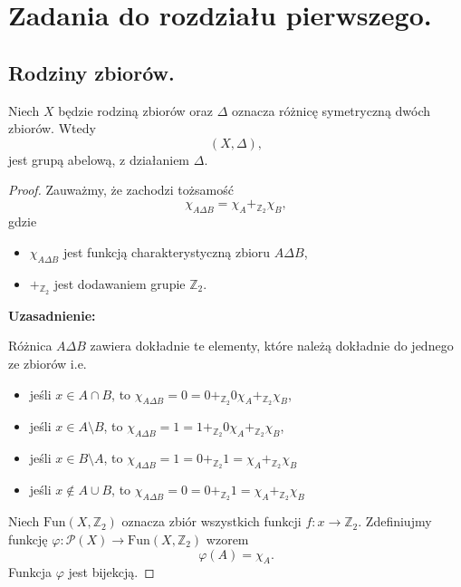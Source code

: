 \chapter{Zadania do rozdziału pierwszego.}

\section{Rodziny zbiorów.}

\begin{lemma}
Niech $X$ będzie rodziną zbiorów oraz $\Delta $ oznacza różnicę symetryczną dwóch zbiorów. Wtedy
\[
	\left( X , \Delta  \right) 
,\] 
jest grupą abelową, z działaniem $\Delta $.
\end{lemma} 
\begin{proof}
	\noindent Zauważmy, że zachodzi tożsamość
	\[
	\chi_{A \Delta B} = \chi_{A} +_{\scriptscriptstyle \mathbb{Z}_2} \chi_{B}
	,\] 
	gdzie
	\begin{itemize}
		\item $\chi_{A \Delta B}$ jest funkcją charakterystyczną zbioru $A \Delta B$,
		\item $+_{\scriptscriptstyle \mathbb{Z} _{2}}$ jest dodawaniem grupie $\mathbb{Z}_{2}$.
	\end{itemize}
	\noindent \textbf{Uzasadnienie:}

	Różnica $A \Delta B$ zawiera dokładnie te elementy, które należą dokładnie do jednego ze zbiorów i.e. 
	\begin{itemize}
		\item jeśli $x\in A \cap B$, to $\chi_{A \Delta B} = 0 = 0 +_{\scriptscriptstyle \mathbb{Z} _{2}} 0 \chi_{A} +_{\scriptscriptstyle \mathbb{Z} _{2}} \chi_{B}$,
		\item jeśli $x\in A \setminus  B$, to $\chi_{A \Delta B} = 1 = 1 +_{\scriptscriptstyle \mathbb{Z} _{2}} 0 \chi_{A} +_{\scriptscriptstyle \mathbb{Z} _{2}} \chi_{B}$,
		\item jeśli $x\in B \setminus  A$, to $\chi_{A \Delta B} = 1 = 0 +_{\scriptscriptstyle \mathbb{Z} _{2}} 1 =  \chi_{A} +_{\scriptscriptstyle \mathbb{Z} _{2}} \chi_{B}$
		\item jeśli $x\not\in A\cup B$, to $\chi_{A \Delta B} = 0 = 0 +_{\scriptscriptstyle \mathbb{Z} _{2}} 1 =  \chi_{A} +_{\scriptscriptstyle \mathbb{Z} _{2}} \chi_{B}$
	\end{itemize}

	\noindent Niech $\text{Fun}\left( X, \mathbb{Z} _{2} \right) $ oznacza zbiór wszystkich funkcji $f: x \to \mathbb{Z} _{2}$. Zdefiniujmy funkcję $\varphi : \mathcal{P}(X) \to \text{Fun}(X, \mathbb{Z} _{2}) $ wzorem \[
	\varphi \left( A \right) = \chi_{A}
	.\] Funkcja $\varphi  $ jest bijekcją.


\end{proof}
